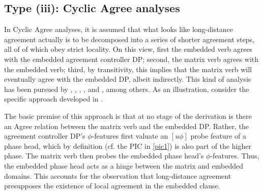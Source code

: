 \documentclass[output=paper
,modfonts
,nonflat]{langsci/langscibook}
\begin{document}
	\subsection{Type (iii): Cyclic Agree analyses}
	
	In Cyclic Agree analyses, it is assumed that what looks like long-distance
	agreement actually is to be decomposed into a series of shorter
	agreement steps, all of of which obey strict locality. On this view,
	first the embedded verb agrees with the embedded agreement controller
	DP; second, the matrix verb agrees with the embedded verb; third, by
	transitivity, this implies that the matrix verb will eventually agree
	with the embedded DP, albeit indirectly. This kind of analysis has
	been pursued by \cite{Butt:95}, \cite{Legate:05:pha}, \cite{Keine:08},
	\cite{Preminger:09}, and \cite{Lahne:12}, among others. As an
	illustration, consider the specific approach developed in
	\cite{Legate:05:pha}.
	
	The basic premise of this approach is that at no stage of the
	derivation is there an Agree relation between the matrix verb and the
	embedded DP.  Rather, the agreement controller DP's $\phi$-features
	first valuate an $[u\phi]$ probe feature of a phase head, which by
	definition (cf. the PIC in \ref{pic1}) is also part of the higher
	phase.  The matrix verb then probes the embedded phase head's
	$\phi$-features.  Thus, the embedded phase head acts as a hinge
	between the matrix and embedded domains.  This accounts for the
	observation that long-distance agreement presupposes the existence of
	local agreement in the embedded clause. 
	
\end{document}
